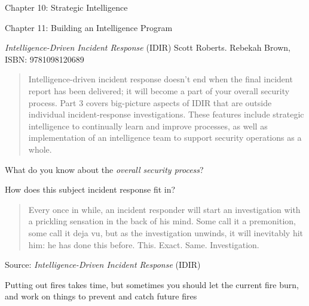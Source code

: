 \documentclass[Screen16to9,17pt]{foils}
\begin{document}
\begin{list2}
\item Chapter 10: Strategic Intelligence
\item Chapter 11: Building an Intelligence Program
\end{list2}



\emph{Intelligence-Driven Incident Response} (IDIR)
 Scott Roberts. Rebekah Brown, ISBN: 9781098120689

\begin{quote}
Intelligence-driven incident response doesn’t end when the final incident report has been delivered; it will become a part of your overall security process. Part 3 covers big-picture aspects of IDIR that are outside individual incident-response investigations. These features include strategic intelligence to continually learn and improve processes, as well as implementation of an intelligence team to support security operations as a whole.
\end{quote}

\begin{list2}
\item What do you know about the \emph{overall security process}?
\item How does this subject incident response fit in?
\end{list2}




\begin{quote}
Every once in while, an incident responder will start an investigation with a prickling
sensation in the back of his mind. Some call it a premonition, some call it deja vu, but
as the investigation unwinds, it will inevitably hit him: he has done this before. This.
Exact. Same. Investigation.
\end{quote}
Source: \emph{Intelligence-Driven Incident Response} (IDIR)


\begin{list2}
\item Putting out fires takes time, but sometimes you should let the current fire burn, and work on things to prevent and catch future fires
\end{list2}



\end{document}
